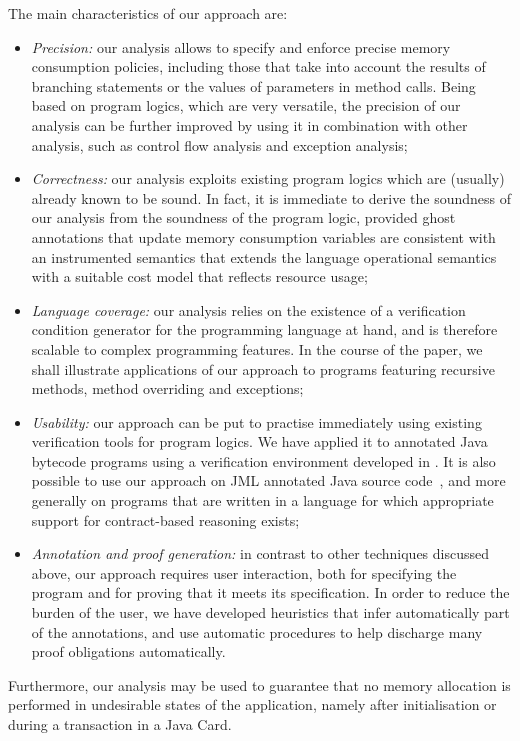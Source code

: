 The main characteristics of our approach are:
\begin{itemize}
\item \emph{Precision:} our analysis allows to specify and enforce
precise memory consumption policies, including those that take
into account the results of branching statements or the values of
parameters in method calls. Being based on program logics, which are
very versatile, the precision of our analysis can be further improved
by using it in combination with other analysis, such as control flow
analysis and exception analysis;


\item \emph{Correctness:} our analysis exploits existing program logics
which are (usually) already known to be sound. In fact, it is immediate
to derive the soundness of our analysis from the soundness of the program
logic, provided ghost annotations that update memory consumption variables
are consistent with an instrumented semantics that  extends the language
operational semantics with a suitable cost model that reflects resource
usage;

\item \emph{Language coverage:} our analysis relies on the existence
of a verification condition generator for the programming language at
hand, and is therefore scalable to complex programming features.  In
the course of the paper, we shall illustrate applications of our
approach to programs featuring recursive methods, method
overriding and exceptions;


\item \emph{Usability:} our approach can be put to practise
immediately using existing verification tools for program logics. We
have applied it to annotated Java bytecode programs using a
verification environment developed in \cite{LM05:acc}. It is also
possible to use our approach on JML annotated Java source
code~\cite{BRL-JACK}, and more generally on programs that are written
in a language for which appropriate support for contract-based
reasoning exists;




\item \emph{Annotation and proof generation:} in contrast to other
techniques discussed above, our approach requires user interaction,
both for specifying the program and for proving that it meets its
specification.  In order to reduce the burden of the user, we have
developed heuristics that infer automatically part of the annotations,
and use automatic procedures to help discharge many proof obligations
automatically.
\end{itemize}
Furthermore, our analysis may be used to guarantee that no memory
allocation is performed in undesirable states of the application,
namely after initialisation or during a transaction in a Java Card.

